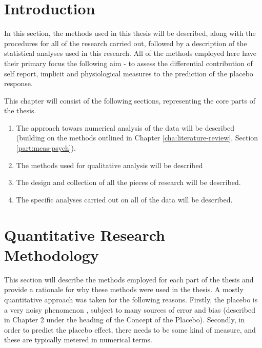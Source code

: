 
\section{Introduction}

In this section, the methods used in this thesis will be described, along with the procedures for all of the research carried out, followed by a description of the statistical analyses used in this research.
All of the methods employed here have their primary focus the following aim - to assess the differential contribution of self report, implicit and physiological measures to the prediction of the placebo response.

This chapter will consist of the following sections, representing the core parts of the thesis.

\begin{enumerate}
\item The approach towars numerical analysis of the data will be described (building on the methods outlined in Chapter \ref{cha:literature-review}, Section \ref{part:meas-psych}). 
\item The methods used for qualitative analysis will be described
\item  The design and collection of all the pieces of research will be described.
\item The specific analyses carried out on all of the data will be described.
\end{enumerate}

\section{Quantitative Research Methodology}
This section  will describe the methods employed for each part of the thesis and provide a rationale for why these methods were used in the thesis.
A mostly quantitative approach was taken for the following reasons. Firstly, the placebo  is a very noisy phenomenon \cite{Singer2005}, subject to many sources of error and bias (described in Chapter 2 under the heading of the Concept of the Placebo). Secondly, in order to predict the placebo effect, there needs to be some kind of measure, and these are typically metered in numerical terms. 

